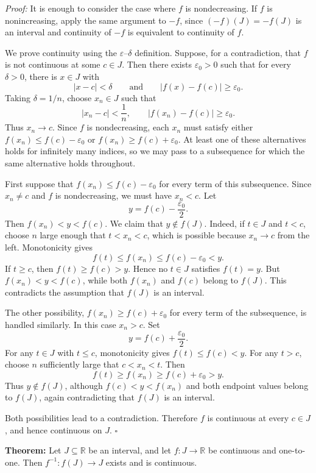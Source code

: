 \documentclass[a4paper,11pt,abstracton]{scrartcl}
\newcommand{\RR}{\mathbb{R}}
\theoremstyle{dotlessP}
\theoremstyle{dotlessS}
\theoremstyle{remark}
\theoremstyle{definition}
\begin{document}
\begin{claim_box}
\textit{Proof:}
It is enough to consider the case where $f$ is nondecreasing. If $f$ is nonincreasing, apply the same argument to $-f$, since $(-f)(J)=-f(J)$ is an interval and continuity of $-f$ is equivalent to continuity of $f$.

We prove continuity using the $\varepsilon$--$\delta$ definition. Suppose, for a contradiction, that $f$ is not continuous at some $c\in J$. Then there exists $\varepsilon_0>0$ such that for every $\delta>0$, there is $x\in J$ with
\[
    |x-c|<\delta
    \qquad\text{and}\qquad
    |f(x)-f(c)|\ge\varepsilon_0.
\]
Taking $\delta=1/n$, choose $x_n\in J$ such that
\[
    |x_n-c|<\frac1n,
    \qquad |f(x_n)-f(c)|\ge\varepsilon_0.
\]
Thus $x_n\to c$. Since $f$ is nondecreasing, each $x_n$ must satisfy either $f(x_n)\le f(c)-\varepsilon_0$ or $f(x_n)\ge f(c)+\varepsilon_0$. At least one of these alternatives holds for infinitely many indices, so we may pass to a subsequence for which the same alternative holds throughout.

First suppose that $f(x_n)\le f(c)-\varepsilon_0$ for every term of this subsequence. Since $x_n\ne c$ and $f$ is nondecreasing, we must have $x_n<c$. Let
\[
    y=f(c)-\frac{\varepsilon_0}{2}.
\]
Then $f(x_n)<y<f(c)$. We claim that $y\notin f(J)$. Indeed, if $t\in J$ and $t<c$, choose $n$ large enough that $t<x_n<c$, which is possible because $x_n\to c$ from the left. Monotonicity gives
\[
    f(t)\le f(x_n)\le f(c)-\varepsilon_0<y.
\]
If $t\ge c$, then $f(t)\ge f(c)>y$. Hence no $t\in J$ satisfies $f(t)=y$. But $f(x_n)<y<f(c)$, while both $f(x_n)$ and $f(c)$ belong to $f(J)$. This contradicts the assumption that $f(J)$ is an interval.

The other possibility, $f(x_n)\ge f(c)+\varepsilon_0$ for every term of the subsequence, is handled similarly. In this case $x_n>c$. Set
\[
    y=f(c)+\frac{\varepsilon_0}{2}.
\]
For any $t\in J$ with $t\le c$, monotonicity gives $f(t)\le f(c)<y$. For any $t>c$, choose $n$ sufficiently large that $c<x_n<t$. Then
\[
    f(t)\ge f(x_n)\ge f(c)+\varepsilon_0>y.
\]
Thus $y\notin f(J)$, although $f(c)<y<f(x_n)$ and both endpoint values belong to $f(J)$, again contradicting that $f(J)$ is an interval.

Both possibilities lead to a contradiction. Therefore $f$ is continuous at every $c\in J$, and hence continuous on $J$.
\hfill$\square$
\end{claim_box}

\begin{problem_box}
\textbf{Theorem:}
Let $J\subseteq\RR$ be an interval, and let $f:J\to\RR$ be continuous and one-to-one. Then $f^{-1}:f(J)\to J$ exists and is continuous.
\end{problem_box}
\end{document}
